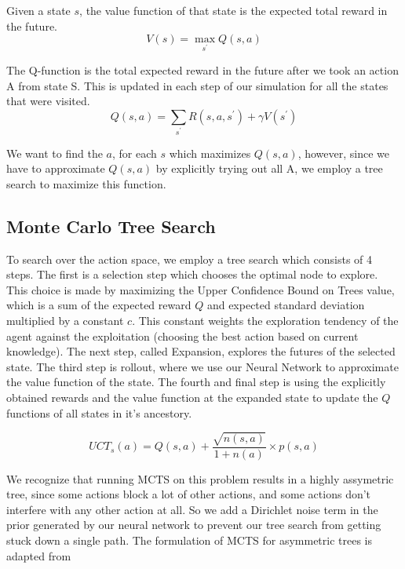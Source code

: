 \documentclass[%
 reprint,
 amsmath,amssymb,
 aps,
]{revtex4-2}
\begin{document}
Given a state $s$, the value function of that state is the expected total reward in the future.
\begin{equation}
    V(s) = \max_{s^\prime} Q(s, a)
\end{equation}

The Q-function is the total expected reward in the future after we took an action A from state S. This is updated in each step of our simulation for all the states that were visited.
\begin{equation}
    Q(s, a) = \sum_{s^\prime} R(s, a, s^\prime) + \gamma V(s^\prime)
\end{equation}

We want to find the $a$, for each $s$ which maximizes $Q(s, a)$, however, since we have to approximate $Q(s, a)$ by explicitly trying out all A, we employ a tree search to maximize this function.

\subsection{\label{sec:method-mcts}Monte Carlo Tree Search}

To search over the action space, we employ a tree search which consists of 4 steps. The first is a selection step which chooses the optimal node to explore. This choice is made by maximizing the Upper Confidence Bound on Trees value, which is a sum of the expected reward $Q$ and expected standard deviation multiplied by a constant $c$. This constant weights the exploration tendency of the agent against the exploitation (choosing the best action based on current knowledge). The next step, called Expansion, explores the futures of the selected state. The third step is rollout, where we use our Neural Network to approximate the value function of the state. The fourth and final step is using the explicitly obtained rewards and the value function at the expanded state to update the $Q$ functions of all states in it's ancestory.

\begin{equation}
    UCT_s(a) = Q(s, a) + \frac{\sqrt{n(s, a)}}{1 + n(a)} \times p(s, a)
\end{equation}

We recognize that running MCTS on this problem results in a highly assymetric tree, since some actions block a lot of other actions, and some actions don't interfere with any other action at all. So we add a Dirichlet noise term in the prior generated by our neural network to prevent our tree search from getting stuck down a single path. The formulation of MCTS for asymmetric trees is adapted from \citet{mcts_assymetric}
\end{document}
